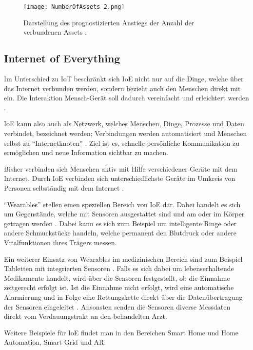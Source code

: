 \begin{figure}%
\centering
\texttt{[image: NumberOfAssets\_2.png]} 
\caption{Darstellung des prognostizierten Anstiegs der Anzahl der verbundenen Assets \cite{SiemensMSIntroduction}.}
\label{fig:NumberOfAssets}
\end{figure}

\subsection{Internet of Everything}
Im Unterschied zu \ac{IoT} beschränkt sich \ac{IoE} nicht nur auf die Dinge, welche über das Internet verbunden werden, sondern bezieht auch den Menschen direkt mit ein. Die Interaktion Mensch-Gerät soll dadurch vereinfacht und erleichtert werden \parencite{andelfinger2014internet}. 

\ac{IoE} kann also auch als Netzwerk, welches Menschen, Dinge, Prozesse und Daten verbindet, bezeichnet werden; Verbindungen werden automatisiert und Menschen selbst zu "`Internetknoten"' \parencite{batallabeyond}. Ziel ist es, schnelle persönliche Kommunikation zu ermöglichen und neue Information sichtbar zu machen.

Bisher verbinden sich Menschen aktiv mit Hilfe verschiedener Geräte mit dem Internet. Durch \ac{IoE} verbinden sich unterschiedlichste Geräte im Umkreis von Personen selbständig mit dem Internet \parencite{batallabeyond}.
 
"`Wearables"' stellen einen speziellen Bereich von \ac{IoE} dar. Dabei handelt es sich um Gegenstände, welche mit Sensoren ausgestattet sind und am oder im Körper getragen werden \parencite{andelfinger2014internet}. Dabei kann es sich zum Beispiel um intelligente Ringe oder andere Schmuckstücke handeln, welche permanent den Blutdruck oder andere Vitalfunktionen ihres Trägers messen. 

Ein weiterer Einsatz von Wearables im medizinischen Bereich sind zum Beispiel Tabletten mit integrierten Sensoren \parencite{batallabeyond}. Falls es sich dabei um lebenserhaltende Medikamente handelt, wird über die Sensoren festgestellt, ob die Einnahme zeitgerecht erfolgt ist. Ist die Einnahme nicht erfolgt, wird eine automatische Alarmierung und in Folge eine Rettungskette direkt über die Datenübertragung der Sensoren eingeleitet \parencite{batallabeyond}. Ansonsten senden die Sensoren diverse Messdaten direkt vom Verdauungstrakt an den behandelten Arzt.

Weitere Beispiele für \ac{IoE} findet man in den Bereichen Smart Home und Home Automation, Smart Grid und \acl{AR}.

